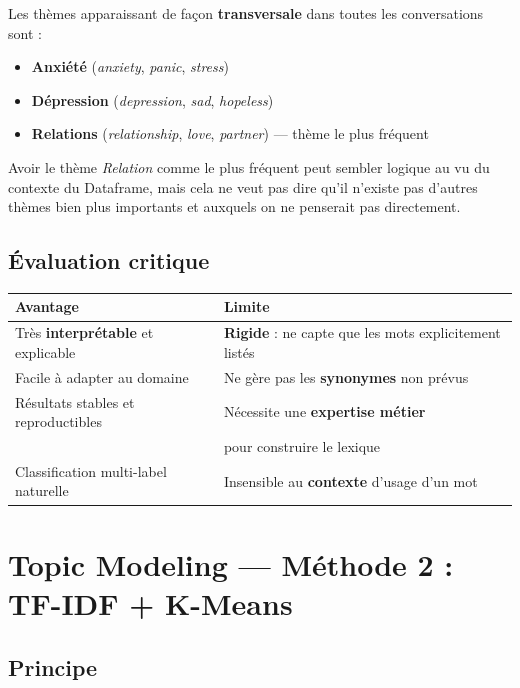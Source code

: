 \documentclass[12pt,a4paper]{article}
\begin{document}
Les thèmes apparaissant de façon \textbf{transversale} dans toutes les conversations sont :

\begin{itemize}
  \item \textbf{Anxiété} (\textit{anxiety}, \textit{panic}, \textit{stress})
  \item \textbf{Dépression} (\textit{depression}, \textit{sad}, \textit{hopeless})
  \item \textbf{Relations} (\textit{relationship}, \textit{love}, \textit{partner}) --- thème le plus fréquent
\end{itemize}

Avoir le thème \textit{Relation} comme le plus fréquent peut sembler logique au vu du contexte du Dataframe, mais cela ne veut pas dire qu'il n'existe pas d'autres thèmes bien plus importants et auxquels on ne penserait pas directement.

\subsection{Évaluation critique}

\begin{center}
\begin{tabular}{ll}
\toprule
\textbf{Avantage} & \textbf{Limite} \\
\midrule
Très \textbf{interprétable} et explicable & \textbf{Rigide} : ne capte que les mots explicitement listés \\
Facile à adapter au domaine & Ne gère pas les \textbf{synonymes} non prévus \\
Résultats stables et reproductibles & Nécessite une \textbf{expertise métier} \\ & pour construire le lexique \\
Classification multi-label naturelle & Insensible au \textbf{contexte} d'usage d'un mot \\
\bottomrule
\end{tabular}
\end{center}

\pagebreak
\section{Topic Modeling --- Méthode 2 : TF-IDF + K-Means}

\subsection{Principe}
\end{document}
